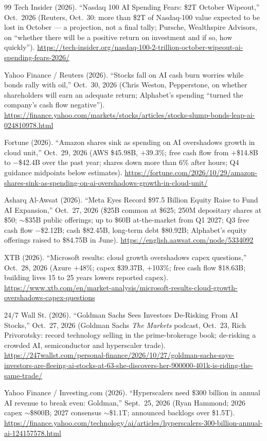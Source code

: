 \documentclass[11pt,letterpaper]{article}
\begin{document}
\begin{thebibliography}{99}
Tech Insider (2026). ``Nasdaq 100 AI Spending Fears: \$2T October Wipeout,'' Oct.~2026 (Reuters, Oct.~30: more than \$2T of Nasdaq-100 value expected to be lost in October --- a projection, not a final tally; Pursche, Wealthspire Advisors, on ``whether there will be a positive return on investment and if so, how quickly''). \url{https://tech-insider.org/nasdaq-100-2-trillion-october-wipeout-ai-spending-fears-2026/}

Yahoo Finance / Reuters (2026). ``Stocks fall on AI cash burn worries while bonds rally with oil,'' Oct.~30, 2026 (Chris Weston, Pepperstone, on whether shareholders will earn an adequate return; Alphabet's spending ``turned the company's cash flow negative''). \url{https://finance.yahoo.com/markets/stocks/articles/stocks-slump-bonds-leap-ai-024810978.html}

Fortune (2026). ``Amazon shares sink as spending on AI overshadows growth in cloud unit,'' Oct.~29, 2026 (AWS \$45.98B, $+$39.3\%; free cash flow from $+$\$14.8B to $-$\$42.4B over the past year; shares down more than 6\% after hours; Q4 guidance midpoints below estimates). \url{https://fortune.com/2026/10/29/amazon-shares-sink-as-spending-on-ai-overshadows-growth-in-cloud-unit/}

Asharq Al-Awsat (2026). ``Meta Eyes Record \$97.5 Billion Equity Raise to Fund AI Expansion,'' Oct.~27, 2026 (\$25B common at \$625; 250M depositary shares at \$50; $\sim$\$35B public offerings; up to \$60B at-the-market from Q1 2027; Q3 free cash flow $-$\$2.12B; cash \$82.45B, long-term debt \$80.92B; Alphabet's equity offerings raised to \$84.75B in June). \url{https://english.aawsat.com/node/5334092}

XTB (2026). ``Microsoft results: cloud growth overshadows capex questions,'' Oct.~28, 2026 (Azure $+$48\%; capex \$39.37B, $+$103\%; free cash flow \$18.63B; building lives 15 to 25 years lowers reported capex). \url{https://www.xtb.com/en/market-analysis/microsoft-results-cloud-growth-overshadows-capex-questions}

24/7 Wall St. (2026). ``Goldman Sachs Sees Investors De-Risking From AI Stocks,'' Oct.~27, 2026 (Goldman Sachs \emph{The Markets} podcast, Oct.~23, Rich Privorotsky: record technology selling in the prime-brokerage book; de-risking a crowded AI, semiconductor and hyperscaler trade). \url{https://247wallst.com/personal-finance/2026/10/27/goldman-sachs-says-investors-are-fleeing-ai-stocks-at-63-she-discovers-her-900000-401k-is-riding-the-same-trade/}

Yahoo Finance / Investing.com (2026). ``Hyperscalers need \$300 billion in annual AI revenue to break even: Goldman,'' Sept.~25, 2026 (Ryan Hammond; 2026 capex $\sim$\$800B; 2027 consensus $\sim$\$1.1T; announced backlogs over \$1.5T). \url{https://finance.yahoo.com/technology/ai/articles/hyperscalers-300-billion-annual-ai-124157578.html}

\end{thebibliography}
\end{document}
